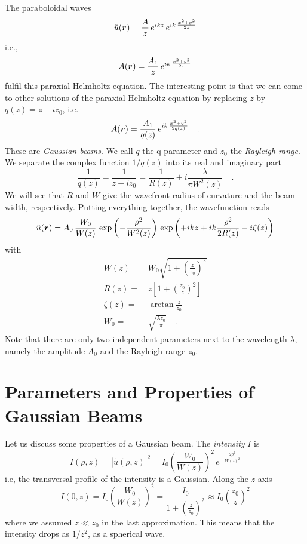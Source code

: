 The paraboloidal waves 
\begin{equation}
    \tilde{u}(\boldsymbol{r}) = \frac{A}{z} \, e^{i k z} \, e^{i k \, \frac{x^2 + y^2}{2z}  }
\end{equation}
i.e.,
\begin{equation}
    A(\boldsymbol{r}) = \frac{A_1}{z}  \, e^{i k \, \frac{x^2 + y^2}{2z}  }
\end{equation}
fulfil this paraxial Helmholtz equation. The interesting point is that we can come to other solutions of the paraxial Helmholtz equation by replacing $z$ by $q(z) = z - i z_0$, i.e.
\begin{equation}
    A(\boldsymbol{r}) = \frac{A_1}{q(z)}  \, e^{i k \, \frac{x^2 + y^2}{2q(z)}  } \quad .
\end{equation}
These are \emph{Gaussian beams}. We call $q$ the q-parameter and $z_0$ the \emph{Rayleigh range}. We separate the complex function $1/q(z)$ into its real and imaginary part
\begin{equation}
    \frac{1}{q(z)} = \frac{1}{z -i z_0} = \frac{1}{R(z)} + i \frac{\lambda}{\pi W^2(z)} \quad .
\end{equation}
We will see that $R$ and $W$ give the wavefront radius of curvature and the beam width, respectively. Putting everything together, the wavefunction reads
\begin{equation}
    \tilde{u}(\boldsymbol{r}) = A_0 \, \frac{W_0}{W(z)} \, 
    \exp \left( - \frac{\rho^2}{W^2(z)}  \right) \, 
    \exp \left( +i kz +ik  \frac{\rho^2}{2 R(z)}  - i \zeta(z) \right) 
\end{equation}
with
\begin{align}
    W(z) = & W_0 \sqrt{1 + \left( \frac{z}{z_0} \right)^2    } \label{eq:2_wz} \\
    R(z) = & z \left[ 1 + \left( \frac{z_0}{z} \right)^2 \right] \\
    \zeta(z) = & \arctan \frac{z}{z_0} \\
    W_0 = & \sqrt{\frac{\lambda z_0}{\pi}} \quad . \label{eq:2_w0}
\end{align}
Note that there are only two independent parameters next to the wavelength $\lambda$, namely the amplitude $A_0$ and the Rayleigh range $z_0$.



\section{Parameters and Properties of Gaussian Beams}

Let us discuss some properties of a Gaussian beam. The \emph{intensity} $I$ is
\begin{equation}
    I(\rho, z) = | \tilde{u}(\rho, z) |^2 = I_0 \left( \frac{W_0}{W(z)}  \right)^2 \, e^{- \frac{2 \rho^2}{W(z)^2} }
\end{equation}
i.e, the transversal profile of the intensity is a Gaussian. Along the $z$ axis
\begin{equation}
    I(0, z) =  I_0 \left( \frac{W_0}{W(z)} \right)^2= \frac{I_0}{1 + \left( \frac{z}{z_0} \right)^2}  \approx I_0  \left( \frac{z_0}{z} \right)^2
\end{equation}
where we assumed $z \ll z_0$ in the last approximation. This means that the intensity drops as $1/z^2$, as a spherical wave.


